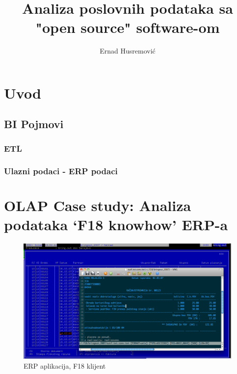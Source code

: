 \documentclass[times, utf8, seminar]{fit}
\begin{document}
\title{Analiza poslovnih podataka sa "open source" software-om}

\author{Ernad Husremović}


\maketitle

\tableofcontents

\chapter{Uvod}

\section{BI Pojmovi}

\subsection{ETL}

\subsection{Ulazni podaci - ERP podaci}

\chapter{OLAP Case study: Analiza podataka `F18 knowhow' ERP-a}

\begin{figure}[H]
\centering
\includegraphics[width=15cm]{img/F18_erp.png}
\caption{ERP aplikacija, F18 klijent}
\end{figure}
\end{document}
